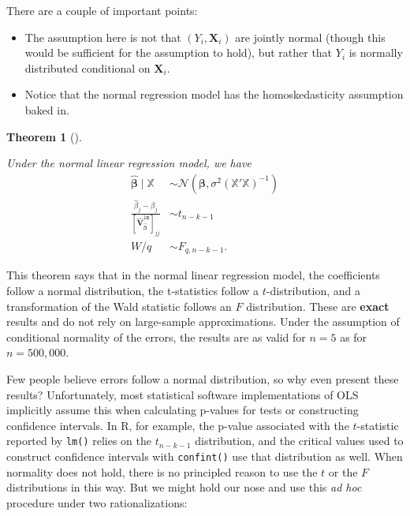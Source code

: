 \documentclass[
  13pt,
  letterpaper,
  DIV=11,
  numbers=noendperiod]{scrreprt}
\providecommand{\tightlist}{%
  \setlength{\itemsep}{0pt}\setlength{\parskip}{0pt}}
\newcommand{\mb}{\bm}
\newcommand{\N}{\mathcal{N}}
\newcommand{\X}{\mb{X}}
\newcommand{\Xmat}{\mathbb{X}}
\newcommand{\bfbeta}{\mb{\beta}}
\newcommand{\bhat}{\widehat{\mb{\beta}}}
\theoremstyle{plain}
\newtheorem{theorem}{Theorem}[chapter]
\theoremstyle{plain}
\theoremstyle{definition}
\theoremstyle{definition}
\theoremstyle{remark}
\begin{document}
There are a couple of important points:

\begin{itemize}
\tightlist
\item
  The assumption here is not that \((Y_{i}, \X_{i})\) are jointly normal
  (though this would be sufficient for the assumption to hold), but
  rather that \(Y_i\) is normally distributed conditional on \(\X_i\).
\item
  Notice that the normal regression model has the homoskedasticity
  assumption baked in.
\end{itemize}

\begin{theorem}[]\protect\hypertarget{thm-normal-ols}{}\label{thm-normal-ols}

Under the normal linear regression model, we have \[ 
\begin{aligned}
  \bhat \mid \Xmat &\sim \N\left(\bfbeta, \sigma^{2}\left(\Xmat'\Xmat\right)^{-1}\right) \\
  \frac{\widehat{\beta}_{j} - \beta_{j}}{[\widehat{\mb{V}}^{\texttt{lm}}_{\bhat}]_{jj}} &\sim t_{n-k-1} \\
  W/q &\sim F_{q, n-k-1}. 
\end{aligned}
\]

\end{theorem}

This theorem says that in the normal linear regression model, the
coefficients follow a normal distribution, the t-statistics follow a
\(t\)-distribution, and a transformation of the Wald statistic follows
an \(F\) distribution. These are \textbf{exact} results and do not rely
on large-sample approximations. Under the assumption of conditional
normality of the errors, the results are as valid for \(n = 5\) as for
\(n = 500,000\).

Few people believe errors follow a normal distribution, so why even
present these results? Unfortunately, most statistical software
implementations of OLS implicitly assume this when calculating p-values
for tests or constructing confidence intervals. In R, for example, the
p-value associated with the \(t\)-statistic reported by \texttt{lm()}
relies on the \(t_{n-k-1}\) distribution, and the critical values used
to construct confidence intervals with \texttt{confint()} use that
distribution as well. When normality does not hold, there is no
principled reason to use the \(t\) or the \(F\) distributions in this
way. But we might hold our nose and use this \emph{ad hoc} procedure
under two rationalizations:
\end{document}
